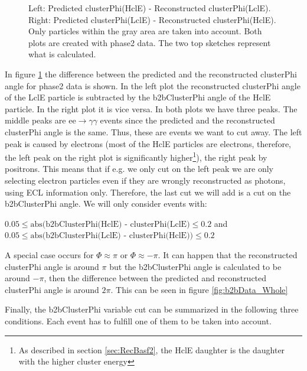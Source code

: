 \documentclass[a4paper,11pt,twosided,final,german,openbib,pdftex,listof=totoc,bibliography=totoc]{scrbook}
\begin{document}
\begin{figure}[h!]
\begin{minipage}[b]{\textwidth}
	\caption[b2bClusterPhi - clusterPhi For Beamtime-Data]{Left: Predicted clusterPhi(HclE) - Reconstructed clusterPhi(LclE). Right: Predicted clusterPhi(LclE) - Reconstructed clusterPhi(HclE). Only particles within the gray area are taken into account. Both plots are created with phase2 data. The two top sketches represent what is calculated.}
	\label{fig:b2bData}

\end{minipage}
\end{figure}


In figure \ref{fig:b2bData} the difference between the predicted and the reconstructed clusterPhi angle for phase2 data is shown. In the left plot the reconstructed clusterPhi angle of the LclE particle is subtracted by the b2bClusterPhi angle of the HclE particle. In the right plot it is vice versa. In both plots we have three peaks. The middle peaks are $\textrm{ee} \rightarrow \gamma \gamma$ events since the predicted and the reconstructed clusterPhi angle is the same. Thus, these are events we want to cut away. The left peak is caused by electrons (most of the HclE particles are electrons, therefore, the left peak on the right plot is significantly higher\footnote{As described in section \ref{sec:RecBasf2}, the HclE daughter is the daughter with the higher cluster energy}), the right peak by positrons. This means that if e.g. we only cut on the left peak we are only selecting electron particles even if they are wrongly reconstructed as photons, using ECL information only. 
Therefore, the last cut we will add is a cut on the b2bClusterPhi angle. We will only consider events with:
\newline

 $0.05 \leq \textrm{abs(b2bClusterPhi(HclE) - clusterPhi(LclE)} \leq 0.2 $ and  $0.05 \leq \textrm{abs(b2bClusterPhi(LclE) - clusterPhi(HclE))} \leq 0.2$
\newline


A special case occurs for $\Phi \approx \pi$ or $\Phi \approx -\pi$. It can happen that the reconstructed clusterPhi angle is around $\pi$ but the b2bClusterPhi angle is calculated to be around $-\pi$, then the difference between the predicted and reconstructed clusterPhi angle is around $2\pi$. This can be seen in figure \ref{fig:b2bData_Whole}

Finally, the b2bClusterPhi variable cut can be summarized in the following three conditions. Each event has to fulfill one of them to be taken into account.
\end{document}
